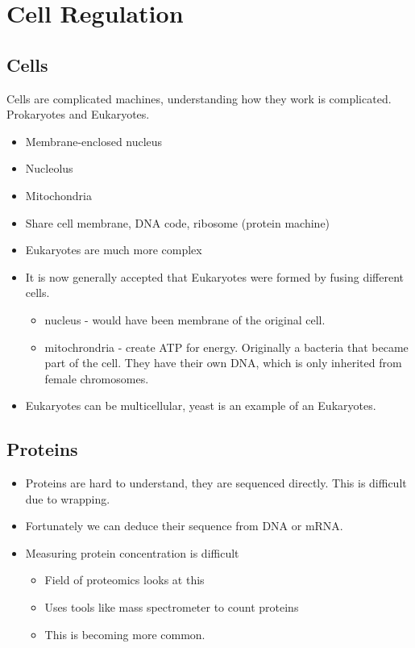 \section{Cell Regulation}

\subsection{Cells}
Cells are complicated machines, understanding how they work is complicated. \\

\noindent Prokaryotes and Eukaryotes.
\begin{itemize}
    \itemsep0em
    \item Membrane-enclosed nucleus
    \item Nucleolus
    \item Mitochondria
\end{itemize}

\begin{itemize}
    \itemsep0em
    \item Share cell membrane, DNA code, ribosome (protein machine)
    \item Eukaryotes are much more complex
    \item It is now generally accepted that Eukaryotes were formed by fusing different cells.
    \begin{itemize}
        \itemsep0em
        \item nucleus - would have been membrane of the original cell.
        \item mitochrondria - create ATP for energy. Originally a bacteria that became part of the cell. They have their own DNA, which is only inherited from female chromosomes.
    \end{itemize}
    \item Eukaryotes can be multicellular, yeast is an example of an Eukaryotes.
\end{itemize}

\subsection{Proteins}
\begin{itemize}
    \itemsep0em
    \item Proteins are hard to understand, they are sequenced directly. This is difficult due to wrapping.
    \item Fortunately we can deduce their sequence from DNA or mRNA.
    \item Measuring protein concentration is difficult
    \begin{itemize}
        \item Field of proteomics looks at this
        \item Uses tools like mass spectrometer to count proteins
        \item This is becoming more common.
    \end{itemize}
\end{itemize}

